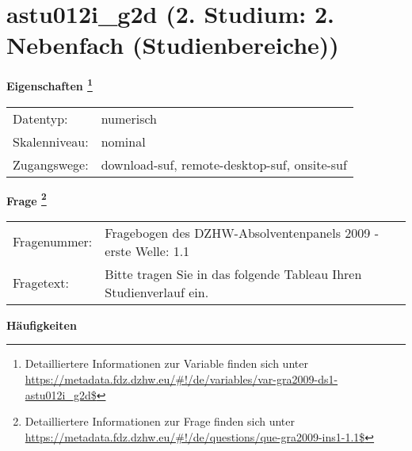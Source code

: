 
    \setcounter{footnote}{0}

    \vspace*{-1.8cm}
	\section{astu012i\_g2d (2. Studium: 2. Nebenfach (Studienbereiche))}
	\label{section:astu012i_g2d}



    \vspace*{0.5cm}
    \noindent\textbf{Eigenschaften
	\footnote{Detailliertere Informationen zur Variable finden sich unter
		\url{https://metadata.fdz.dzhw.eu/\#!/de/variables/var-gra2009-ds1-astu012i_g2d$}}}\\
	\begin{tabularx}{\hsize}{@{}lX}
	Datentyp: & numerisch \\
	Skalenniveau: & nominal \\
	Zugangswege: &
	  download-suf, 
	  remote-desktop-suf, 
	  onsite-suf
 \\
    \end{tabularx}



				\vspace*{0.5cm}
                \noindent\textbf{Frage
	                \footnote{Detailliertere Informationen zur Frage finden sich unter
		              \url{https://metadata.fdz.dzhw.eu/\#!/de/questions/que-gra2009-ins1-1.1$}}}\\
				\begin{tabularx}{\hsize}{@{}lX}
					Fragenummer: &
					  Fragebogen des DZHW-Absolventenpanels 2009 - erste Welle:
					  1.1
 \\
					Fragetext: & Bitte tragen Sie in das folgende Tableau Ihren Studienverlauf ein. \\
				\end{tabularx}





        		\vspace*{0.5cm}
                \noindent\textbf{Häufigkeiten}

